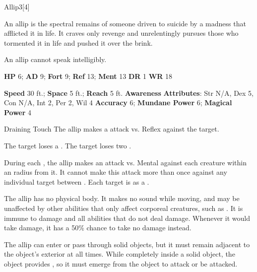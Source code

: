  \begin{monsection}{Allip}{3}[4]
    \vspace{-1em}\vspace{-1em}
    \vspace{0em}

    
      An allip is the spectral remains of someone driven to suicide by a madness that afflicted it in life.
      It craves only revenge and unrelentingly pursues those who tormented it in life and pushed it over the brink.

      An allip cannot speak intelligibly.
    

    \begin{spellcontent}
      \begin{spelltargetinginfo}
        \pari \textbf{HP} 6;
          \textbf{AD} 9;
          \textbf{Fort} 9;
          \textbf{Ref} 13;
          \textbf{Ment} 13
        \pari \textbf{DR} 1
        \pari \textbf{WR} 18
        
      \end{spelltargetinginfo}
    \end{spellcontent}
    \begin{monsterfooter}
      \pari \textbf{Speed} 30 ft.;
        \textbf{Space} 5 ft.;
        \textbf{Reach} 5 ft.
      \pari \textbf{Awareness} 
      \pari \textbf{Attributes}:
        Str N/A, Dex 5,
        Con N/A, Int 2,
        Per 2, Wil 4
      \pari \textbf{Accuracy} 6;
        \textbf{Mundane Power} 6;
      \textbf{Magical Power} 4
    \end{monsterfooter}
  \end{monsection}
  \begin{freeability}{Draining Touch}
       The allip makes a  attack
        vs. Reflex against the target.
    
    \hit The target loses a .
    \crit The target loses two .
    \end{freeability}
  
          During each , the allip makes an attack vs. Mental against each creature
          within an \arealarge radius  from it.
          It cannot make this attack more than once against any individual target between .
          \hit Each target is  as a .
        
      The allip has no physical body.
      It makes no sound while moving, and may be unaffected by other abilities that only affect corporeal creatures, such as .
      It is immune to  damage and all  abilities that do not deal damage.
      Whenever it would take damage, it has a 50\% chance to take no damage instead.

      The allip can enter or pass through solid objects, but it must remain adjacent to the object's exterior at all times.
      While completely inside a solid object, the object provides , so it must emerge from the object to attack or be attacked.
  

